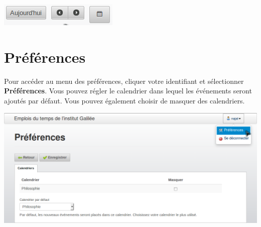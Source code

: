 \documentclass[a4paper, 11pt]{report}
\begin{document}
			\begin{center}
				\includegraphics[scale = 1]{naviguer_dans_calendrier.png}
			\end{center}
		\section{Préférences}
			Pour accéder au menu des préférences, cliquer votre identifiant et sélectionner \textbf{Préférences}. Vous pouvez régler le calendrier dans lequel les événements seront ajoutés par défaut. Vous pouvez également choisir de masquer des calendriers.

			\begin{center}
				\includegraphics[scale = 0.45]{preferences.png}
			\end{center}
\end{document}
